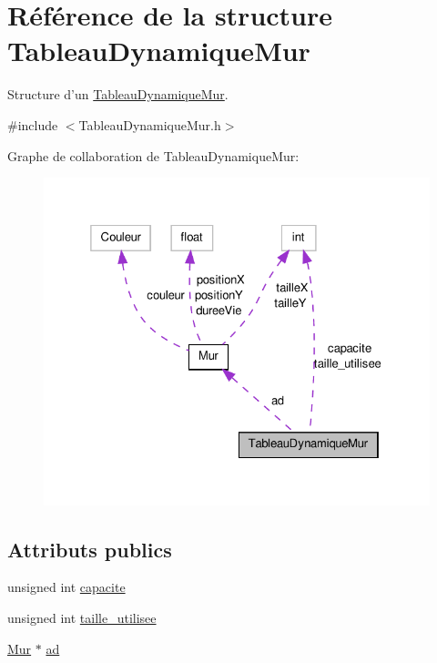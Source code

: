\hypertarget{structTableauDynamiqueMur}{\section{Référence de la structure Tableau\-Dynamique\-Mur}
\label{structTableauDynamiqueMur}
}


Structure d'un \hyperlink{structTableauDynamiqueMur}{Tableau\-Dynamique\-Mur}.  




{\ttfamily \#include $<$Tableau\-Dynamique\-Mur.\-h$>$}



Graphe de collaboration de Tableau\-Dynamique\-Mur\-:\nopagebreak
\begin{figure}[H]
\begin{center}
\leavevmode
\includegraphics[width=325pt]{structTableauDynamiqueMur__coll__graph}
\end{center}
\end{figure}
\subsection*{Attributs publics}
\begin{DoxyCompactItemize}
\item 
unsigned int \hyperlink{structTableauDynamiqueMur_a3ac67653487ce5f4ae8e1c2626469f45}{capacite}
\item 
unsigned int \hyperlink{structTableauDynamiqueMur_a10c3a4a33a8a9071a70788920a8459b5}{taille\-\_\-utilisee}
\item 
\hyperlink{structMur}{Mur} $\ast$ \hyperlink{structTableauDynamiqueMur_a922754666b4214fea4cb56fdacddc2e4}{ad}
\end{DoxyCompactItemize}


